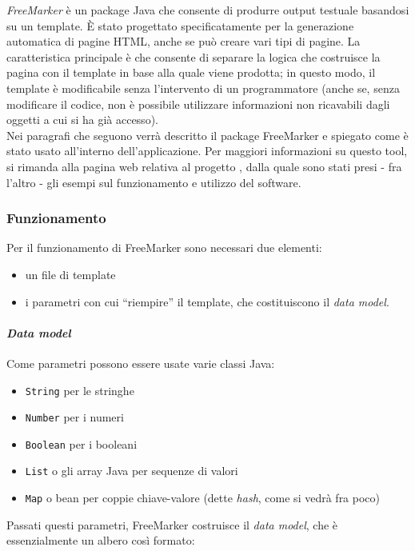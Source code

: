 
\textsl{FreeMarker} è un package Java che consente di produrre output testuale basandosi su un template. È stato progettato specificatamente per la generazione automatica di pagine HTML, anche se può creare vari tipi di pagine. La caratteristica principale è che consente di separare la logica che costruisce la pagina con il template in base alla quale viene prodotta; in questo modo, il template è modificabile senza l'intervento di un programmatore (anche se, senza modificare il codice, non è possibile utilizzare informazioni non ricavabili dagli oggetti a cui si ha già accesso).\\
Nei paragrafi che seguono verrà descritto il package FreeMarker e spiegato come è stato usato all'interno dell'applicazione. Per maggiori informazioni su questo tool, si rimanda alla pagina web relativa al progetto \cite{freemarker}, dalla quale sono stati presi - fra l'altro - gli esempi sul funzionamento e utilizzo del software.


\subsubsection{Funzionamento}
Per il funzionamento di FreeMarker sono necessari due elementi:
\begin{itemize}
\item un file di template
\item i parametri con cui \textquotedblleft riempire\textquotedblright{} il template, che costituiscono il \textit{data model}.
\end{itemize}

\paragraph{\textit{Data model}}
Come parametri possono essere usate varie classi Java:

\begin{itemize}
\item \lstinline{String} per le stringhe
\item \lstinline{Number} per i numeri
\item \lstinline{Boolean} per i booleani
\item \lstinline{List} o gli array Java per sequenze di valori
\item \lstinline{Map} o bean per coppie chiave-valore (dette \textsl{hash}, come si vedrà fra poco)
\end{itemize}

Passati questi parametri, FreeMarker costruisce il \textit{data model}, che è essenzialmente un albero così formato:

